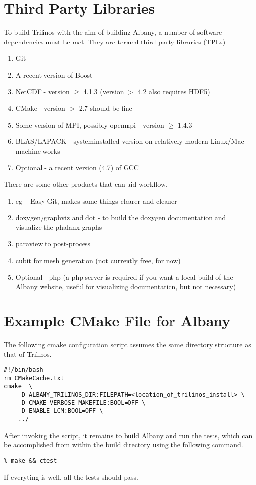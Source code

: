 \documentclass[pdf,12pt,report,strict]{SANDreport}
\theoremstyle{remark}
\begin{document}
\section{Third Party Libraries}

To build Trilinos with the aim of building Albany, a number of
software dependencies must be met. They are termed third party
libraries (TPLs). 
\begin{enumerate}
\item Git
\item A recent version of Boost
\item NetCDF - version $\ge$ 4.1.3 (version $>$ 4.2 also requires
  HDF5)
\item CMake - version $>$ 2.7 should be fine
\item Some version of MPI, possibly openmpi - version $\ge$ 1.4.3
\item BLAS/LAPACK - systeminstalled version on relatively modern
  Linux/Mac machine works
\item Optional - a recent version (4.7) of GCC
\end{enumerate}
There are some other products that can aid workflow.
\begin{enumerate}
\item eg -- Easy Git, makes some things clearer and cleaner
\item doxygen/graphviz and dot - to build the doxygen documentation
  and visualize the phalanx graphs
\item paraview to post-process
\item cubit for mesh generation (not currently free, for now)
\item Optional - php (a php server is required if you want a local
  build of the Albany website, useful for visualizing documentation,
  but not necessary)
\end{enumerate}

\section{Example CMake File for Albany}
The following cmake configuration script assumes the same
directory structure as that of Trilinos.
\begin{verbatim}
#!/bin/bash
rm CMakeCache.txt
cmake  \
    -D ALBANY_TRILINOS_DIR:FILEPATH=<location_of_trilinos_install> \
    -D CMAKE_VERBOSE_MAKEFILE:BOOL=OFF \
    -D ENABLE_LCM:BOOL=OFF \
    ../
\end{verbatim}
After invoking the script, it remains to build Albany and run the
tests, which can be accomplished from within the build directory using
the following command.
\begin{verbatim}
% make && ctest
\end{verbatim}
If everyting is well, all the tests should pass.
\end{document}
